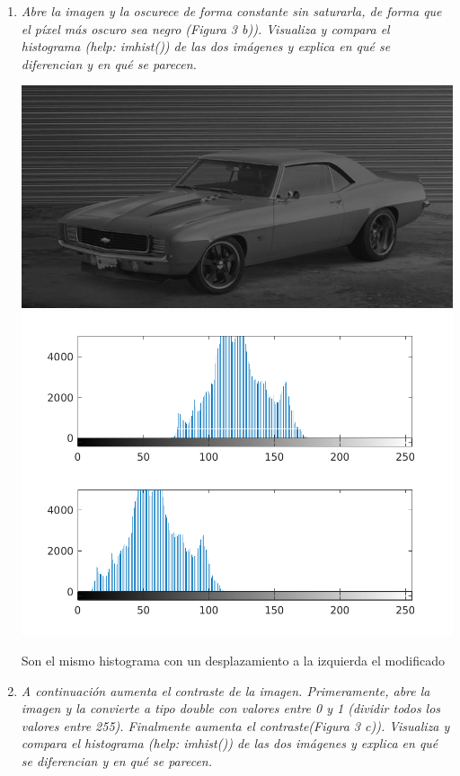 \documentclass[a4paper,10pt]{article}
\begin{document}
\begin{enumerate}
\begin{enumerate}
 \item \textit{Abre la imagen y la oscurece de forma constante sin 
saturarla, de forma que el píxel más oscuro sea negro (Figura 3 b)). Visualiza y compara el histograma (help: imhist()) de las dos imágenes y explica en qué se diferencian y en qué se parecen.}

 \begin{center}
 \includegraphics[scale=0.4]{car_dark} 
 \includegraphics[scale=0.6]{subplot_2_low}
 \end{center}

 Son el mismo histograma con un desplazamiento a la izquierda el modificado

 \item \textit{A continuación aumenta el contraste de la imagen. Primeramente, abre la imagen y la convierte a tipo double con valores entre 0 y 1 (dividir todos los valores entre 255). Finalmente aumenta el contraste(Figura 3 c)). Visualiza y compara el histograma (help: imhist()) de las dos imágenes y explica en qué se diferencian y en qué se parecen.}


\end{enumerate}
\end{enumerate}
\end{document}
